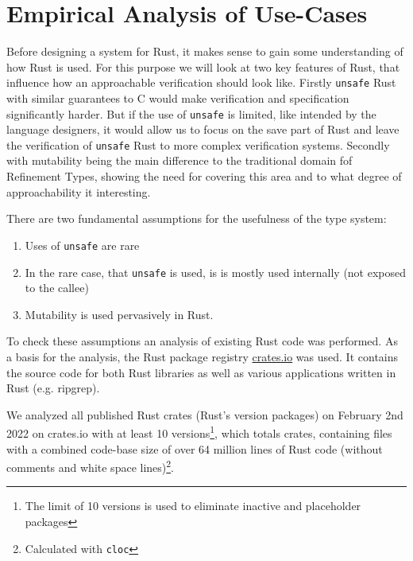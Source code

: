 \documentclass{book}
\newcommand{\code}[1]{\texttt{#1}}
\theoremstyle{definition}
\begin{document}
\chapter{Empirical Analysis of Use-Cases}

Before designing a system for Rust, it makes sense to gain some understanding of how Rust is used. For this purpose we will look at two key features of Rust, that influence how an approachable verification should look like.
Firstly \code{unsafe} Rust with similar guarantees to C would make verification and specification significantly harder. But if the use of \code{unsafe} is limited, like intended by the language designers, it would allow us to focus on the save part of Rust and leave the verification of \code{unsafe} Rust to more complex verification systems.
Secondly with mutability being the main difference to the traditional domain fof Refinement Types, showing the need for covering this area and to what degree of approachability it interesting.

There are two fundamental assumptions for the usefulness of the type system: 
\begin{enumerate}
  \item \label{enum:hypothesis-unsafe-rare} Uses of \code{unsafe} are rare
  \item \label{enum:hypothesis-unsafe-lib} In the rare case, that \code{unsafe} is used, is is mostly used internally (not exposed to the callee)
  \item \label{enum:hypothesis-mut} Mutability is used pervasively in Rust.
\end{enumerate}

To check these assumptions an analysis of existing Rust code was performed. As a basis for the analysis, the Rust package registry \href{https://www.crates.io}{crates.io} was used. It contains the source code for both Rust libraries as well as various applications written in Rust (e.g. ripgrep). 

We analyzed all published Rust crates (Rust's version packages) on February 2nd 2022 on crates.io with at least 10 versions\footnote{The limit of 10 versions is used to eliminate inactive and placeholder packages}, which totals  crates, containing  files with a combined code-base size of over 64 million lines of Rust code (without comments and white space lines)\footnote{Calculated with \texttt{cloc}}. 
\end{document}
